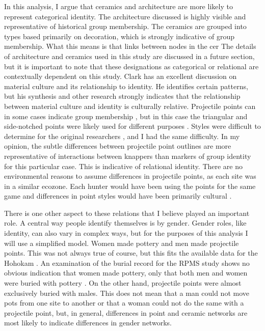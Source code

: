\documentclass[]{interact}
\theoremstyle{plain}%
\theoremstyle{definition}
\theoremstyle{remark}
\begin{document}
In this analysis, I argue that ceramics and architecture are more likely
to represent categorical identity. The architecture discussed is highly
visible and representative of historical group membership. The ceramics
are grouped into types based primarily on decoration, which is strongly
indicative of group membership. What this means is that links between
nodes in the cer The details of architecture and ceramics used in this
study are discussed in a future section, but it is important to note
that these designations as categorical or relational are contextually
dependent on this study. Clark \citeyearpar{Clark2001-ck} has an
excellent discussion on material culture and its relationship to
identity. He identifies certain patterns, but his synthesis and other
research
\citep{Carr1995-mq, Carr1995-sh, Dietler1998-zo, Gosselain1998-qd, Gosselain2000-wf, Gosselain2016-as, Hodder1982-no, Huntley2008-qu, Lemonnier1986-le, Lyons2003-yy, Neuzil2008-zd, Sassman2001-sw, Stark1998-mu, Wiessner1983-ei, Wiessner1997-su}
strongly indicates that the relationship between material culture and
identity is culturally relative. Projectile points can in some cases
indicate group membership \citep{Wiessner1983-ei, Wiessner1997-su}, but
in this case the triangular and side-notched points were likely used for
different purposes \citep[see][]{Loendorf2015-ww, Sliva2002-oz}. Styles
were difficult to determine for the original researchers
\citep{Rice1994-rk}, and I had the same difficulty. In my opinion, the
subtle differences between projectile point outlines are more
representative of interactions between knappers than markers of group
identity for this particular case. This is indicative of relational
identity. There are no environmental reasons to assume differences in
projectile points, as each site was in a similar ecozone. Each hunter
would have been using the points for the same game and differences in
point styles would have been primarily cultural \citep{Sliva2002-oz}.

There is one other aspect to these relations that I believe played an
important role. A central way people identify themselves is by gender.
Gender roles, like identity, can also vary in complex ways, but for the
purposes of this analysis I will use a simplified model. Women made
pottery and men made projectile points. This was not always true of
course, but this fits the available data for the Hohokam
\citep[p.~253]{Crown1996-xb, VanPool2010-im}. An examination of the
burial record for the RPMS study shows no obvious indication that women
made pottery, only that both men and women were buried with pottery
\citep[Table 10.7]{Loendorf1998-ln}. On the other hand, projectile
points were almost exclusively buried with males. This does not mean
that a man could not move pots from one site to another or that a woman
could not do the same with a projectile point, but, in general,
differences in point and ceramic networks are most likely to indicate
differences in gender networks.
\end{document}
